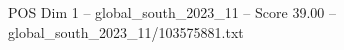 \begin{textsample}{POS Dim 1 – global\_south\_2023\_11 – Score 39.00 – global\_south\_2023\_11/103575881.txt}
\end{textsample}
